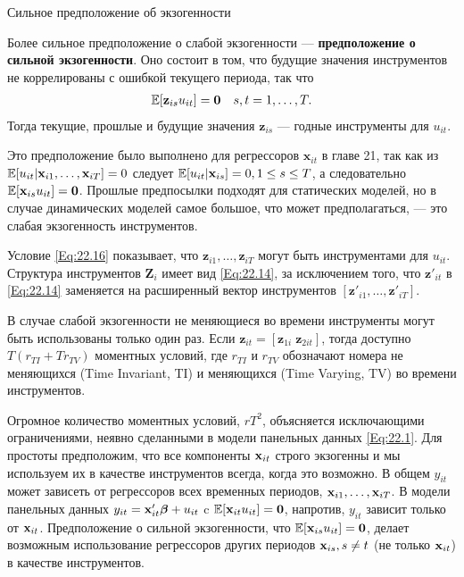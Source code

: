 {\centering  Сильное предположение об экзогенности}

Более сильное предположение  о слабой экзогенности  --- \textbf{предположение о сильной экзогенности}. Оно состоит в том, что будущие значения инструментов не коррелированы с ошибкой текущего периода, так что
\begin{align}
&\mathbb{E} [\mathbf z_{is} u_{it}] =\mathbf 0
& s, t=1, \dots, T.
\label{Eq:22.16}
\end{align}
Тогда текущие, прошлые и будущие значения $\mathbf z_{is}$ --- годные инструменты для $u_{it}$.

Это предположение было выполнено для регрессоров $\mathbf x_{it}$  в главе 21, так как из $\mathbb{E}[u_{it}| \mathbf x_{i1}, \dots, \mathbf x_{iT}]=0$ следует $\mathbb{E}[u_{it} | \mathbf{x}_{is}]=0, 1 \leq s \leq T$, а следовательно $\mathbb{E}[\mathbf{x}_{is} u_{it}]= \mathbf 0$. Прошлые предпосылки подходят для статических моделей, но в случае динамических моделей самое большое, что может предполагаться, --- это слабая экзогенность инструментов.

Условие \ref{Eq:22.16} показывает, что $\mathbf z_{i1}, \dots, \mathbf z_{iT}$ могут быть инструментами для $u_{it}$. Структура инструментов $\mathbf Z_i$ имеет вид \ref{Eq:22.14}, за исключением того, что $\mathbf z'_{it}$ в \ref{Eq:22.14} заменяется на расширенный вектор инструментов $[\mathbf z'_{i1}, \dots, \mathbf z'_{iT}]$.

В случае слабой экзогенности не меняющиеся во времени инструменты могут быть использованы только один раз. Если $\mathbf z_{it}=[\mathbf z_{1i} \; \mathbf z_{2it}]$, тогда доступно $T(r_{TI}+Tr_{TV})$ моментных условий, где $r_{TI}$ и $r_{TV}$  обозначают номера не меняющихся (Time Invariant, TI) и меняющихся (Time Varying, TV) во времени инструментов.

 Огромное количество моментных условий, $rT^2$, объясняется исключающими ограничениями, неявно сделанными в модели панельных данных \ref{Eq:22.1}. Для простоты предположим, что все компоненты $\mathbf{x}_{it}$ строго экзогенны и мы используем их в качестве инструментов всегда, когда это возможно. В общем $y_{it}$ может зависеть от регрессоров всех временных периодов, $\mathbf{x}_{i1}, \dots, \mathbf{x}_{iT}$. В модели панельных данных $y_{it}=\mathbf{x}'_{it}\bm{\beta}+u_{it}$ c $\mathbb{E}[\mathbf{x}_{it} u_{it}]=\mathbf 0$, напротив, $y_{it}$ зависит только от $\mathbf{x}_{it}$. Предположение о сильной экзогенности, что $\mathbb{E}[\mathbf{x}_{is} u_{it}]=\mathbf 0$, делает возможным использование регрессоров других периодов $\mathbf{x}_{is}, s \neq t$ (не только $\mathbf{x}_{it}$)  в качестве инструментов. 

